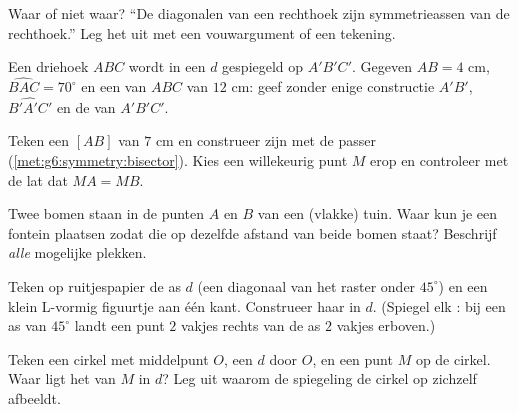 \begin{exercise}[$\star$]\label{exo:g6:symmetry:5}
Waar of niet waar? ``De diagonalen van een rechthoek zijn symmetrieassen van de
rechthoek.'' Leg het uit met een vouwargument of een tekening.
\end{exercise}

\begin{exercise}[$\star$]\label{exo:g6:symmetry:6}
Een driehoek $ABC$ wordt in een  $d$ gespiegeld op $A'B'C'$. Gegeven
$AB = 4$ cm, $\widehat{BAC} = 70^\circ$ en een  van $ABC$ van $12$ cm:
geef zonder enige constructie $A'B'$, $\widehat{B'A'C'}$ en de  van
$A'B'C'$.
\end{exercise}

\begin{exercise}[$\star$]\label{exo:g6:symmetry:7}
Teken een  $[AB]$ van $7$ cm en construeer zijn  met de
passer (\cref{met:g6:symmetry:bisector}). Kies een willekeurig punt $M$ erop en
controleer met de lat dat $MA = MB$.
\end{exercise}

\begin{exercise}[$\star\star$]\label{exo:g6:symmetry:8}
Twee bomen staan in de punten $A$ en $B$ van een (vlakke) tuin. Waar kun je een
fontein plaatsen zodat die op dezelfde afstand van beide bomen staat? Beschrijf
\emph{alle} mogelijke plekken.
\end{exercise}

\begin{exercise}[$\star\star$]\label{exo:g6:symmetry:9}
Teken op ruitjespapier de as $d$ (een diagonaal van het raster onder
$45^\circ$) en een klein L-vormig figuurtje aan één kant. Construeer haar
 in $d$. (Spiegel elk : bij een as van $45^\circ$ landt een
punt $2$ vakjes rechts van de as $2$ vakjes erboven.)
\end{exercise}

\begin{exercise}[$\star\star$]\label{exo:g6:symmetry:10}
Teken een cirkel met middelpunt $O$, een  $d$ door $O$, en een punt $M$ op
de cirkel. Waar ligt het  van $M$ in $d$? Leg uit waarom de
spiegeling de cirkel op zichzelf afbeeldt.
\end{exercise}

